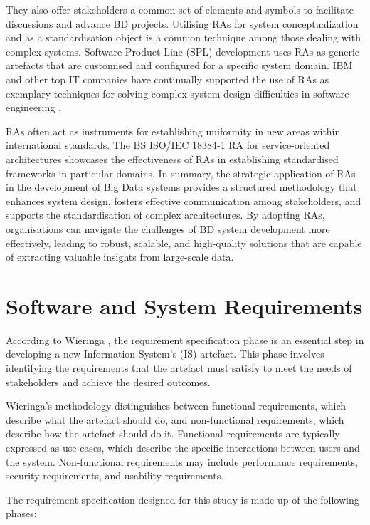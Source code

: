 \documentclass[review]{elsarticle}
\begin{document}
They also offer stakeholders a common set of elements and symbols to facilitate discussions and advance BD projects. Utilising RAs for system conceptualization and as a standardisation object is a common technique among those dealing with complex systems. Software Product Line (SPL) development uses RAs as generic artefacts that are customised and configured for a specific system domain. IBM and other top IT companies have continually supported the use of RAs as exemplary techniques for solving complex system design difficulties in software engineering \cite{ataei2022state}. 

RAs often act as instruments for establishing uniformity in new areas within international standards. The BS ISO/IEC 18384-1 RA \cite{Iso18384-1} for service-oriented architectures showcases the effectiveness of RAs in establishing standardised frameworks in particular domains. In summary, the strategic application of RAs in the development of Big Data systems provides a structured methodology that enhances system design, fosters effective communication among stakeholders, and supports the standardisation of complex architectures. By adopting RAs, organisations can navigate the challenges of BD system development more effectively, leading to robust, scalable, and high-quality solutions that are capable of extracting valuable insights from large-scale data.

\section{Software and System Requirements}

\label{sec:software_and_system_requirements}

According to Wieringa \cite{wieringa2014design}, the requirement specification phase is an essential step in developing a new Information System's (IS) artefact. This phase involves identifying the requirements that the artefact must satisfy to meet the needs of stakeholders and achieve the desired outcomes.

Wieringa's methodology distinguishes between functional requirements, which describe what the artefact should do, and non-functional requirements, which describe how the artefact should do it. Functional requirements are typically expressed as use cases, which describe the specific interactions between users and the system. Non-functional requirements may include performance requirements, security requirements, and usability requirements.

The requirement specification designed for this study is made up of the following phases: 
\end{document}
